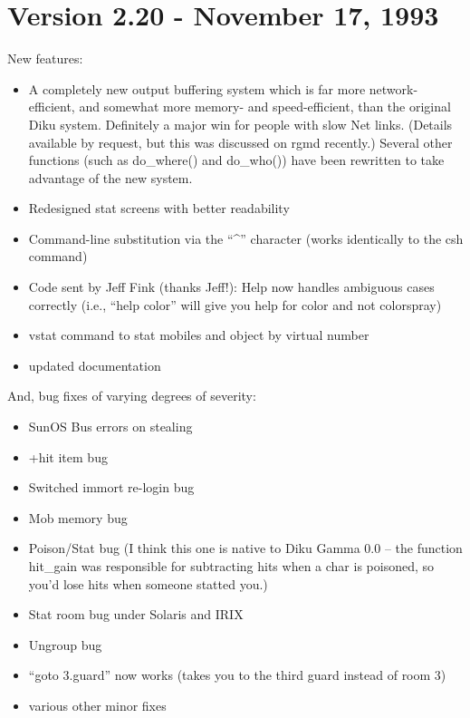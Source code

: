 \documentclass[11pt]{article}
\begin{document}
\section{Version 2.20 - November 17, 1993}
New features:
\begin{itemize}
\item A completely new output buffering system which is far more network-efficient, and somewhat more memory- and speed-efficient, than the original Diku system. Definitely a major win for people with slow Net links.  (Details available by request, but this was discussed on rgmd recently.)  Several other functions (such as do\_where() and do\_who()) have been rewritten to take advantage of the new system.
\item Redesigned stat screens with better readability
\item Command-line substitution via the ``\^{}'' character (works identically to the csh command)
\item Code sent by Jeff Fink (thanks Jeff!): Help now handles ambiguous cases correctly (i.e., ``help color'' will give you help for color and not colorspray)
\item vstat command to stat mobiles and object by virtual number
\item updated documentation
\end{itemize}
And, bug fixes of varying degrees of severity:
\begin{itemize}
\item SunOS Bus errors on stealing
\item +hit item bug
\item Switched immort re-login bug
\item Mob memory bug
\item Poison/Stat bug (I think this one is native to Diku Gamma 0.0 -- the function hit\_gain was responsible for subtracting hits when a char is poisoned, so you'd lose hits when someone statted you.)
\item Stat room bug under Solaris and IRIX
\item Ungroup bug
\item ``goto 3.guard'' now works (takes you to the third guard instead of room 3)
\item various other minor fixes
\end{itemize}
\end{document}

